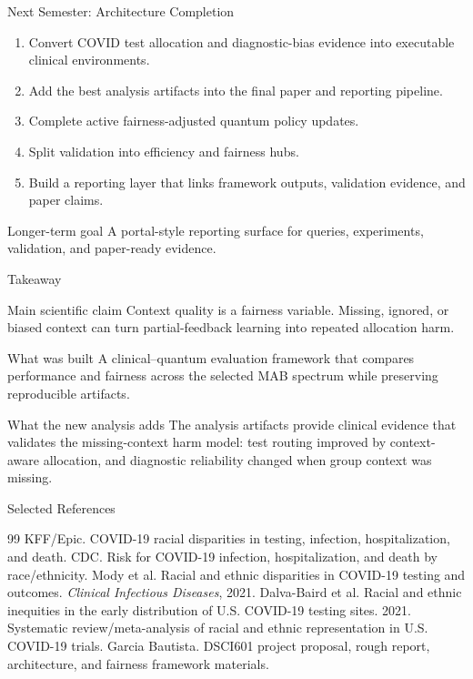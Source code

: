 \documentclass[aspectratio=169,10pt]{beamer}
\begin{document}
\begin{frame}{Next Semester: Architecture Completion}
\begin{enumerate}
    \item Convert COVID test allocation and diagnostic-bias evidence into executable clinical environments.
    \item Add the best analysis artifacts into the final paper and reporting pipeline.
    \item Complete active fairness-adjusted quantum policy updates.
    \item Split validation into efficiency and fairness hubs.
    \item Build a reporting layer that links framework outputs, validation evidence, and paper claims.
\end{enumerate}
\begin{block}{Longer-term goal}
A portal-style reporting surface for queries, experiments, validation, and paper-ready evidence.
\end{block}
\end{frame}

\begin{frame}{Takeaway}
\begin{block}{Main scientific claim}
Context quality is a fairness variable. Missing, ignored, or biased context can turn partial-feedback learning into repeated allocation harm.
\end{block}
\begin{block}{What was built}
A clinical--quantum evaluation framework that compares performance and fairness across the selected MAB spectrum while preserving reproducible artifacts.
\end{block}
\begin{block}{What the new analysis adds}
The analysis artifacts provide clinical evidence that validates the missing-context harm model: test routing improved by context-aware allocation, and diagnostic reliability changed when group context was missing.
\end{block}
\end{frame}

\begin{frame}[allowframebreaks]{Selected References}
\scriptsize
\begin{thebibliography}{99}
 KFF/Epic. COVID-19 racial disparities in testing, infection, hospitalization, and death.
 CDC. Risk for COVID-19 infection, hospitalization, and death by race/ethnicity.
 Mody et al. Racial and ethnic disparities in COVID-19 testing and outcomes. \textit{Clinical Infectious Diseases}, 2021.
 Dalva-Baird et al. Racial and ethnic inequities in the early distribution of U.S. COVID-19 testing sites. 2021.
 Systematic review/meta-analysis of racial and ethnic representation in U.S. COVID-19 trials.
 Garcia Bautista. DSCI601 project proposal, rough report, architecture, and fairness framework materials.
\end{thebibliography}
\end{frame}
\end{document}
